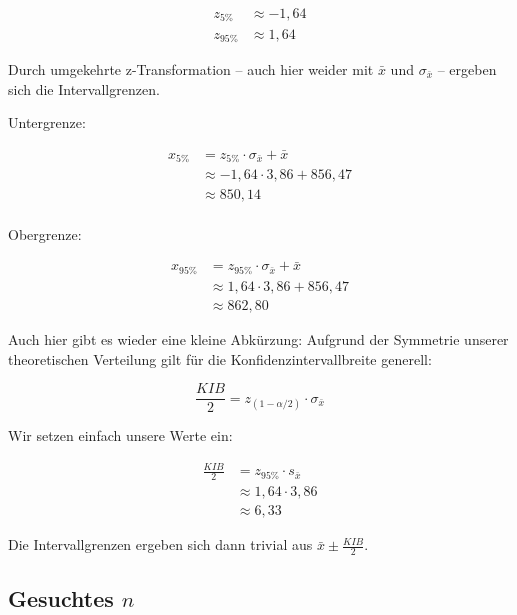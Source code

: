 \documentclass[
  11pt,
  ngerman,
  a4paper,
]{report}
\begin{document}
\nopagebreak

\[\begin{aligned}
z_{5\%}&\approx-1{,}64\\[4pt]
z_{95\%}&\approx 1{,}64
\end{aligned}\]

Durch umgekehrte z-Transformation -- auch hier weider mit \(\bar{x}\) und \(\sigma_{\bar{x}}\) -- ergeben sich die Intervallgrenzen.

Untergrenze:

\nopagebreak

\[\begin{aligned}
x_{5\%} &= z_{5\%} \cdot \sigma_{\bar{x}} + \bar{x}\\[4pt]
&\approx -1{,}64 \cdot 3,86 + 856{,}47\\[4pt]
&\approx 850,14\\[6pt]
\end{aligned}\]

Obergrenze:

\nopagebreak

\[
\begin{aligned}
x_{95\%}&= z_{95\%} \cdot \sigma_{\bar{x}} + \bar{x}\\[4pt]
&\approx 1{,}64 \cdot 3,86 + 856{,}47\\[4pt]
&\approx 862,80
\end{aligned}\]

Auch hier gibt es wieder eine kleine Abkürzung: Aufgrund der Symmetrie unserer theoretischen Verteilung gilt für die Konfidenzintervallbreite generell:

\nopagebreak

\[
\frac{\mathit{KIB}}{2} = z_{(1-\alpha/2)} \cdot \sigma_{\bar{x}}
\label{eq:kib}
\]

Wir setzen einfach unsere Werte ein:

\nopagebreak

\[\begin{aligned}
\frac{\mathit{KIB}}{2} &= z_{95\%} \cdot s_{\bar{x}}\\[4pt]
&\approx1{,}64 \cdot 3,86\\[4pt]
&\approx 6,33
\end{aligned}\]

Die Intervallgrenzen ergeben sich dann trivial aus \(\bar{x} \pm \frac{\mathit{KIB}}{2}\).

\hypertarget{gesuchtes-n}{%
\subsection{\texorpdfstring{Gesuchtes \(n\)}{Gesuchtes n}}\label{gesuchtes-n}}
\end{document}

